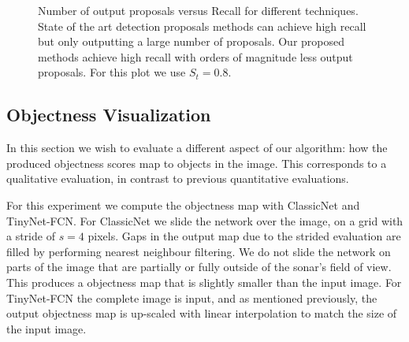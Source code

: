 \begin{figure}[t]
\begin{minipage}[t]{0.70\textwidth}
    \end{minipage}
    \begin{minipage}[t]{0.29\textwidth}
    \vspace*{-5.5cm}
    \end{minipage}
    \forceversofloat
    \vspace*{0.5cm}
    \caption[Number of output proposals versus Recall for different techniques]{Number of output proposals versus Recall for different techniques. State of the art detection proposals methods can achieve high recall but only outputting a large number of proposals. Our proposed methods achieve high recall with orders of magnitude less output proposals. For this plot we use $S_t = 0.8$.}
    \label{proposals:numProposalsVsRecall}
\end{figure}

\subsection{Objectness Visualization}

In this section we wish to evaluate a different aspect of our algorithm: how the produced objectness scores map to objects in the image. This corresponds to a qualitative evaluation, in contrast to previous quantitative evaluations.

For this experiment we compute the objectness map with ClassicNet and TinyNet-FCN. For ClassicNet we slide the network over the image, on a grid with a stride of $s = 4$ pixels. Gaps in the output map due to the strided evaluation are filled by performing nearest neighbour filtering. We do not slide the network on parts of the image that are partially or fully outside of the sonar's field of view. This produces a objectness map that is slightly smaller than the input image.
For TinyNet-FCN the complete image is input, and as mentioned previously, the output objectness map is up-scaled with linear interpolation to match the size of the input image.

